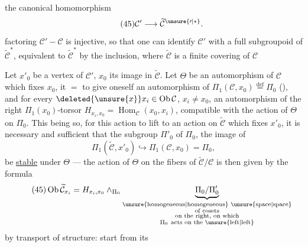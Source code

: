 the canonical homomorphism
\[
\tag{45}\mathcal C'\longrightarrow\widetilde{\mathcal C}^{\unsure{\prime|*}}.
\]
 factoring $\mathcal C'\mathbin{-}\mathcal C$ is injective, so that one can identify $\mathcal C'$ with a full subgroupoid of $\widetilde{\mathcal C}^{*}$, equivalent to $\widetilde{\mathcal C}^{*}$ by the inclusion, where $\widetilde{\mathcal C}$ is a finite covering of $\mathcal C$

Let $x'_0$ be a vertex of $\mathcal C'$, $x_0$ its image in $\widetilde{\mathcal C}$. Let $\Theta$ be an automorphism of $\mathcal C$ which fixes $x_0$,  it   $=$ to give oneself an automorphism of  $\Pi_1(\mathcal C,x_0)\overset{\mathrm{def}}{=}\Pi_0$ (), and for every  $\deleted{\unsure{x}}x_i\in\operatorname{Ob}\mathcal C$, $x_i\ne x_0$, an automorphism of the right $\Pi_1(x_0)$-torsor $H_{x_i,x_0}=\operatorname{Hom}_{\mathcal C}(x_0,x_i)$, compatible with the action of $\Theta$ on $\Pi_0$. This being so, for this action to lift to an action on $\widetilde{\mathcal C}$ which fixes $x'_0$, it is necessary and sufficient that the subgroup $\Pi'_0$ of $\Pi_0$, the image of 
\[
\Pi_1(\widetilde{\mathcal C},x'_0)\hookrightarrow\Pi_1(\mathcal C,x_0)=\Pi_0,
\]
be \uline{stable} under $\Theta$ --- the action of $\Theta$ on the fibers  of $\widetilde{\mathcal C}/\mathcal C$ is then given by the formula
\[
\tag{45}\operatorname{Ob}\widetilde{\mathcal C}_{x_i}=H_{x_i,x_0}\wedge_{\Pi_0}\underbrace{\Pi_0/\Pi'_0}_{\substack{\text{\unsure{homogeneous|homogeneous} \unsure{space|space}}\\\text{of cosets}\\\text{on the right, on which}\\\Pi_0\ \text{acts on the \unsure{left|left}}}}
\]
by transport of structure: start from its
